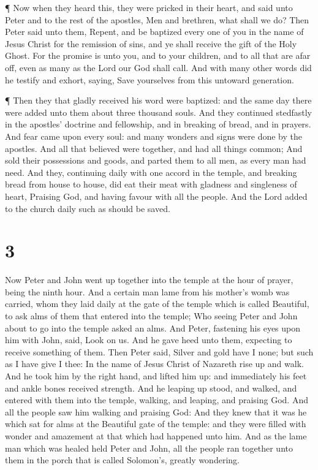  ¶ Now when they heard this, they were pricked in their
heart, and said unto Peter and to the rest of the apostles, Men and
brethren, what shall we do?  Then Peter said unto them,
Repent, and be baptized every one of you in the name of Jesus Christ for
the remission of sins, and ye shall receive the gift of the Holy Ghost.
 For the promise is unto you, and to your children, and to
all that are afar off, even as many as the Lord our God shall call.
 And with many other words did he testify and exhort,
saying, Save yourselves from this untoward generation.

 ¶ Then they that gladly received his word were baptized:
and the same day there were added unto them about three thousand souls.
 And they continued stedfastly in the apostles' doctrine
and fellowship, and in breaking of bread, and in prayers. 
And fear came upon every soul: and many wonders and signs were done by
the apostles.  And all that believed were together, and had
all things common;  And sold their possessions and goods,
and parted them to all men, as every man had need.  And
they, continuing daily with one accord in the temple, and breaking bread
from house to house, did eat their meat with gladness and singleness of
heart,  Praising God, and having favour with all the
people. And the Lord added to the church daily such as should be saved.

\hypertarget{section-2}{%
\section{3}\label{section-2}}

 Now Peter and John went up together into the temple at the
hour of prayer, being the ninth hour.  And a certain man
lame from his mother's womb was carried, whom they laid daily at the
gate of the temple which is called Beautiful, to ask alms of them that
entered into the temple;  Who seeing Peter and John about to
go into the temple asked an alms.  And Peter, fastening his
eyes upon him with John, said, Look on us.  And he gave heed
unto them, expecting to receive something of them.  Then
Peter said, Silver and gold have I none; but such as I have give I thee:
In the name of Jesus Christ of Nazareth rise up and walk. 
And he took him by the right hand, and lifted him up: and immediately
his feet and ankle bones received strength.  And he leaping
up stood, and walked, and entered with them into the temple, walking,
and leaping, and praising God.  And all the people saw him
walking and praising God:  And they knew that it was he
which sat for alms at the Beautiful gate of the temple: and they were
filled with wonder and amazement at that which had happened unto him.
 And as the lame man which was healed held Peter and John,
all the people ran together unto them in the porch that is called
Solomon's, greatly wondering.

